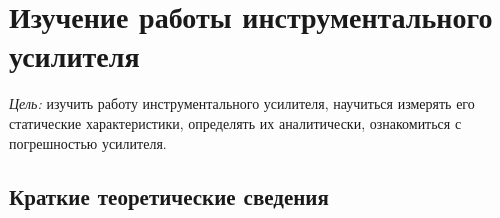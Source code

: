 \section{Изучение работы инструментального усилителя}

{\it Цель:} изучить работу инструментального усилителя, научиться измерять его статические характеристики, определять их аналитически, ознакомиться с погрешностью усилителя.
 
\subsection{Краткие теоретические сведения}

